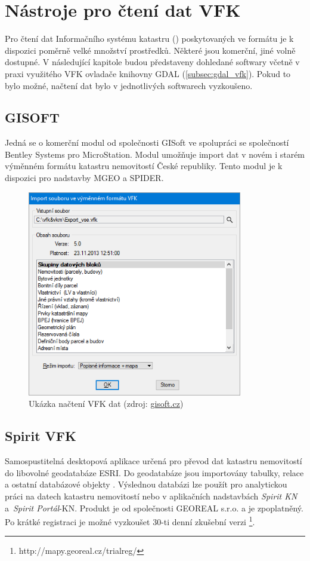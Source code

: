 \section{Nástroje pro čtení dat VFK}
Pro čtení dat Informačního systému katastru () poskytovaných ve formátu  je k dispozici
poměrně velké množství prostředků. Některé jsou komerční, jiné volně
dostupné. V následující kapitole budou představeny dohledané softwary
včetně v praxi využitého VFK ovladače knihovny GDAL
(\ref{subsec:gdal_vfk}). Pokud to bylo možné, načtení dat bylo v
jednotlivých softwarech vyzkoušeno.
\subsection{GISOFT}
Jedná se o komerční modul od společnosti GISoft ve spolupráci se
společností Bentley Systems pro MicroStation. Modul umožňuje import
dat v novém i starém výměnném formátu katastru nemovitostí České
republiky. Tento modul je k dispozici pro nadstavby MGEO a
SPIDER.\cite{gisoft}

\begin{figure}[H]
	 \centering
      \includegraphics[height=9cm]{./pictures/gisoft.png}
      \caption{Ukázka načtení VFK dat (zdroj:
\href{http://www.gisoft.cz/cze/files/Moduly/import-vfk.png}{gisoft.cz})}
      \label{fig:gisoft}
  \end{figure}
\subsection{Spirit VFK}
Samospustitelná desktopová aplikace určená pro převod dat katastru
nemovitostí do libovolné geodatabáze ESRI. Do geodatabáze jsou
importovány tabulky, relace a ostatní databázové objekty
. Výslednou databázi lze použít pro analytickou práci na
datech katastru nemovitostí nebo v aplikačních nadstavbách
\textit{Spirit KN} a~\textit{Spirit Portál}-KN. Produkt je od
společnosti GEOREAL s.r.o. a je zpoplatněný. Po krátké registraci je
možné vyzkoušet 30-ti denní zkušební
verzi \footnote{http://mapy.georeal.cz/trialreg/}.\cite{spirit_vfk}
